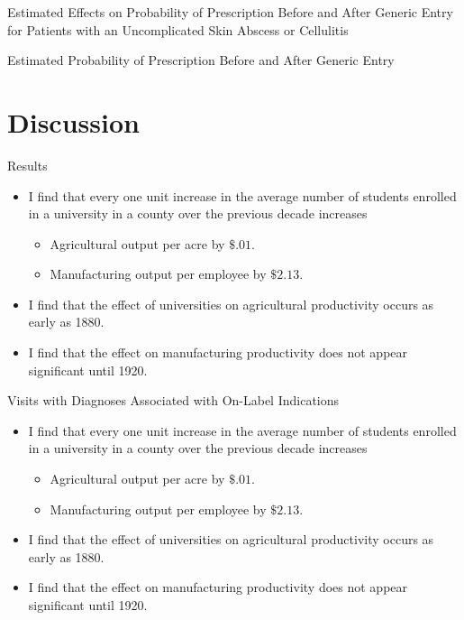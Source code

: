 \documentclass{beamer}
\begin{document}
\begin{frame}{Estimated Effects on Probability of Prescription Before and After Generic Entry for Patients with an Uncomplicated Skin Abscess or Cellulitis}
\begin{center}
\scalebox{.45}{}
\end{center}
\end{frame}

\begin{frame}{Estimated Probability of Prescription Before and After Generic Entry}
\begin{center}
\scalebox{.55}{}
\end{center}
\end{frame}

\section{Discussion}
\begin{frame}{Results}
\begin{itemize}
\item I find that every one unit increase in the average number of students enrolled in a university in a county over the previous decade increases 
\begin{itemize}
\item Agricultural output per acre by $\$.01$. 
\item Manufacturing output per employee by $\$2.13$.
\end{itemize}
\item I find that the effect of universities on agricultural productivity occurs as early as 1880.
\item I find that the effect on manufacturing productivity does not appear significant until 1920.
\end{itemize}
\end{frame}

\begin{frame}{Visits with Diagnoses Associated with On-Label Indications}
\begin{itemize}
\item I find that every one unit increase in the average number of students enrolled in a university in a county over the previous decade increases 
\begin{itemize}
\item Agricultural output per acre by $\$.01$. 
\item Manufacturing output per employee by $\$2.13$.
\end{itemize}
\item I find that the effect of universities on agricultural productivity occurs as early as 1880.
\item I find that the effect on manufacturing productivity does not appear significant until 1920.
\end{itemize}
\end{frame}
\end{document}
